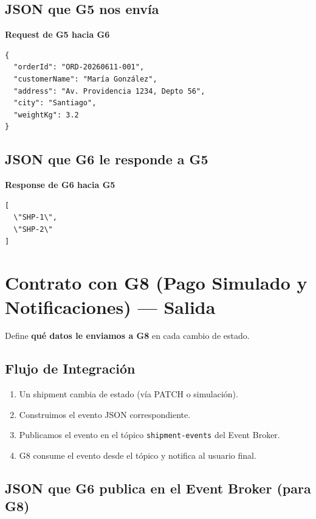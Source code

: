 \documentclass[11pt, a4paper]{article}
\newcommand{\contractheader}[1]{%
  \noindent\colorbox{primary!10}{%
    \parbox{\dimexpr\textwidth-2\fboxsep}{%
      \textbf{\faFileCode\quad #1}%
    }%
  }
  \vspace{0.3cm}
}
\begin{document}
\subsection{JSON que G5 nos envía}

\contractheader{Request de G5 hacia G6}

\begin{lstlisting}
{
  "orderId": "ORD-20260611-001",
  "customerName": "María González",
  "address": "Av. Providencia 1234, Depto 56",
  "city": "Santiago",
  "weightKg": 3.2
}
\end{lstlisting}

\subsection{JSON que G6 le responde a G5}

\contractheader{Response de G6 hacia G5}

\begin{lstlisting}
[
  \"SHP-1\",
  \"SHP-2\"
]
\end{lstlisting}




\section{Contrato con G8 (Pago Simulado y Notificaciones) --- Salida}
\label{sec:contrato-g8}

Define \textbf{qué datos le enviamos a G8} en cada cambio de estado.

\subsection{Flujo de Integración}

\begin{enumerate}[noitemsep]
  \item Un shipment cambia de estado (vía PATCH o simulación).
  \item Construimos el evento JSON correspondiente.
  \item Publicamos el evento en el tópico \texttt{shipment-events} del Event Broker.
  \item G8 consume el evento desde el tópico y notifica al usuario final.
\end{enumerate}

\subsection{JSON que G6 publica en el Event Broker (para G8)}
\end{document}

